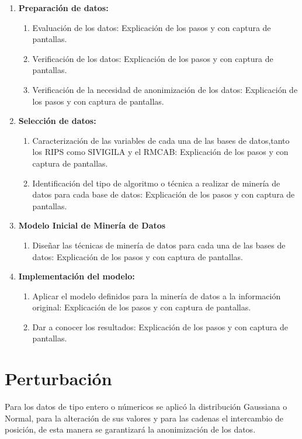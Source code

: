 \documentclass[a4paper,openright,12pt]{book}
\theoremstyle{definition}
\theoremstyle{remark}
\begin{document}
\begin{enumerate}
	\item \textbf{Preparación de datos:}
    \begin{enumerate}
		\item Evaluación de los datos:
        Explicación de los pasos y con captura de pantallas.
    	\item Verificación de los datos:
        Explicación de los pasos y con captura de pantallas.
    	\item Verificación de la necesidad de anonimización de los datos:
        Explicación de los pasos y con captura de pantallas.
	\end{enumerate}
    \item \textbf{Selección de datos:}
    \begin{enumerate}
		\item Caracterización de  las variables de cada una de las bases de datos,tanto los RIPS como SIVIGILA y el RMCAB: Explicación de los pasos y con captura de pantallas.
    	\item Identificación del tipo de algoritmo o técnica a realizar de minería de datos para cada base de datos: Explicación de los pasos y con captura de pantallas.
	\end{enumerate}
    \item \textbf{Modelo Inicial de Minería de Datos}
     \begin{enumerate}
		\item Diseñar las técnicas de minería de datos para cada una de las bases de datos: Explicación de los pasos y con captura de pantallas.
	\end{enumerate}
    \item \textbf{Implementación del modelo:}
      \begin{enumerate}
		\item Aplicar el modelo definidos para la minería de datos a la información original: Explicación de los pasos y con captura de pantallas.
    	\item Dar a conocer los resultados: Explicación de los pasos y con captura de pantallas.
	\end{enumerate}
\end{enumerate}

\section{Perturbación}
Para los datos de tipo entero o númericos se aplicó la distribución Gaussiana o Normal, para la alteración de sus valores y para las cadenas el intercambio de posición, de esta manera se garantizará la anonimización de los datos.
    
\end{document}
